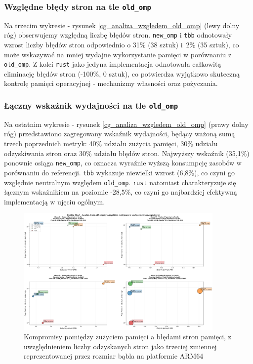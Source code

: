 \subsubsection{Względne błędy stron na tle \texttt{old\_omp}}
Na trzecim wykresie - rysunek \ref{cg_analiza_wzgledem_old_omp} (lewy dolny róg) obserwujemy względną liczbę błędów stron. \texttt{new\_omp} i \texttt{tbb} odnotowały wzrost liczby błędów stron odpowiednio o 31\% (38 sztuk) i~2\% (35 sztuk), co może wskazywać na mniej wydajne wykorzystanie pamięci w porównaniu z \texttt{old\_omp}. Z kolei \texttt{rust} jako jedyna implementacja odnotowała całkowitą eliminację błędów stron (-100\%, 0 sztuk), co potwierdza wyjątkowo skuteczną kontrolę pamięci operacyjnej - mechanizmy własności oraz pożyczania.

\subsubsection{Łączny wskaźnik wydajności na tle \texttt{old\_omp}}
Na ostatnim wykresie - rysunek \ref{cg_analiza_wzgledem_old_omp} (prawy dolny róg) przedstawiono zagregowany wskaźnik wydajności, będący ważoną sumą trzech poprzednich metryk: 40\% udziału zużycia pamięci, 30\% udziału odzyskiwania stron oraz 30\% udziału błędów stron. Najwyższy wskaźnik (35,1\%) ponownie osiąga \texttt{new\_omp}, co oznacza wyraźnie wyższą konsumpcję zasobów w porównaniu do referencji. \texttt{tbb} wykazuje niewielki wzrost (6,8\%), co czyni go względnie neutralnym względem \texttt{old\_omp}. \texttt{rust} natomiast charakteryzuje się łącznym wskaźnikiem na poziomie -28,5\%, co czyni go najbardziej efektywną implementacją w ujęciu ogólnym.

\begin{figure}[H]
    \centering
    \includegraphics[width=0.9\textwidth]{analiza/images/parallel/cg/arm/chart_06_bubble_chart.png}
    \caption{Kompromisy  pomiędzy zużyciem pamięci a błędami stron pamięci, z uwzględnieniem liczby odzyskanych stron jako trzeciej zmiennej reprezentowanej przez rozmiar bąbla na platformie ARM64}
    \label{cg_kompromisy_pamiec_bledy}
\end{figure}

